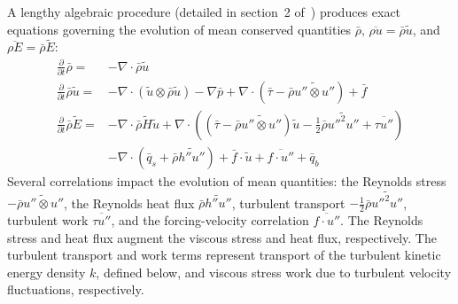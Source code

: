 \documentclass[letterpaper,11pt,nointlimits,reqno,draft]{amsart}
\begin{document}
A lengthy algebraic procedure (detailed in section~2
of~\cite{OliverFANSModels2011}) produces exact equations governing the
evolution of mean conserved quantities $\bar{\rho}$, $\overline{\rho{}u}=
\bar{\rho}\tilde{u}$, and $\overline{\rho{}E} = \bar{\rho}\tilde{E}$:
\begin{subequations}\label{eq:unclosedfansequations}
\begin{align}
    \frac{\partial}{\partial{}t}\bar{\rho}
 =
 &- \nabla\cdot\bar{\rho}\tilde{u}
\\
    \frac{\partial{}}{\partial{}t}\bar{\rho}\tilde{u}
 =
 &- \nabla\cdot(\tilde{u}\otimes\bar{\rho}\tilde{u})
  - \nabla{}\bar{p}
  + \nabla\cdot\left(
        \bar{\tau}
      - \bar{\rho}\widetilde{u''\otimes{}u''}
    \right)
  + \bar{f}
\\
  \frac{\partial}{\partial{}t} \bar{\rho}\tilde{E}
 =
 &- \nabla\cdot{}\bar{\rho}\tilde{H}\tilde{u}
  + \nabla\cdot\left(
        \left(
            \bar{\tau}
          - \bar{\rho} \widetilde{u''\otimes{}u''}
        \right) \tilde{u}
      - \frac{1}{2}\bar{\rho}\widetilde{{u''}^{2}u''}
      + \overline{\tau{}u''}
    \right)
\\
 &- \nabla\cdot\left(
        \bar{q}_s
      + \bar{\rho} \widetilde{h''u''}
    \right)
  + \bar{f}\cdot\tilde{u}
  + \overline{f\cdot{}u''}
  + \bar{q}_{b}
\end{align}
\end{subequations}
Several correlations impact the evolution of mean quantities: the Reynolds
stress $-\bar{\rho}\widetilde{u''\otimes{}u''}$, the Reynolds heat flux
$\bar{\rho} \widetilde{h''u''}$, turbulent transport
$-\frac{1}{2}\bar{\rho}\widetilde{{u''}^{2}u''}$, turbulent work
$\overline{\tau{}u''}$, and the forcing-velocity correlation
$\overline{f\cdot{}u''}$.  The Reynolds stress and heat flux augment the
viscous stress and heat flux, respectively.  The turbulent transport and work
terms represent transport of the turbulent kinetic energy density $k$, defined
below, and viscous stress work due to turbulent velocity fluctuations,
respectively.
\end{document}
